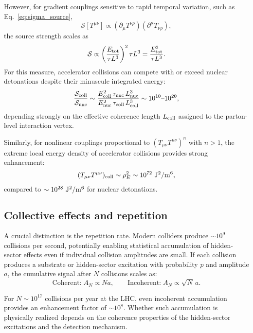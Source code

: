 \documentclass[aps,prd,twocolumn,nofootinbib,superscriptaddress]{revtex4-2}
\begin{document}
However, for gradient couplings sensitive to rapid temporal variation, such as Eq.~\eqref{eq:sigma_source},
\begin{equation}
    \mathcal{S}[T^{\mu\nu}] \propto (\partial_\mu T^{\nu\rho})(\partial^\mu T_{\nu\rho}),
\end{equation}
the source strength scales as
\begin{equation}
    \mathcal{S} \propto \left(\frac{E_{\rm tot}}{\tau L^3}\right)^2 \tau L^3
    = \frac{E_{\rm tot}^2}{\tau L^3}.
\end{equation}
For this measure, accelerator collisions can compete with or exceed nuclear detonations despite their minuscule integrated energy:
\begin{equation}
    \frac{\mathcal{S}_{\rm coll}}{\mathcal{S}_{\rm nuc}}
    \sim \frac{E_{\rm coll}^2 \, \tau_{\rm nuc} \, L_{\rm nuc}^3}
              {E_{\rm nuc}^2 \, \tau_{\rm coll} \, L_{\rm coll}^3}
    \sim 10^{10} \text{--} 10^{20},
\end{equation}
depending strongly on the effective coherence length $L_{\rm coll}$ assigned to the parton-level interaction vertex.

Similarly, for nonlinear couplings proportional to $(T_{\mu\nu} T^{\mu\nu})^n$ with $n > 1$, the extreme local energy density of accelerator collisions provides strong enhancement:
\begin{equation}
    (T_{\mu\nu} T^{\mu\nu})_{\rm coll} \sim \rho_E^2 \sim 10^{72}~{\rm J}^2/{\rm m}^6,
\end{equation}
compared to $\sim 10^{28}~{\rm J}^2/{\rm m}^6$ for nuclear detonations.

\subsection{Collective effects and repetition}

A crucial distinction is the repetition rate. Modern colliders produce $\sim 10^{9}$ collisions per second, potentially enabling statistical accumulation of hidden-sector effects even if individual collision amplitudes are small. If each collision produces a substrate or hidden-sector excitation with probability $p$ and amplitude $a$, the cumulative signal after $N$ collisions scales as:
\begin{equation}
    \text{Coherent:} \; A_N \propto N a, \qquad
    \text{Incoherent:} \; A_N \propto \sqrt{N} \, a.
\end{equation}

For $N \sim 10^{17}$ collisions per year at the LHC, even incoherent accumulation provides an enhancement factor of $\sim 10^{8}$. Whether such accumulation is physically realized depends on the coherence properties of the hidden-sector excitations and the detection mechanism.
\end{document}
